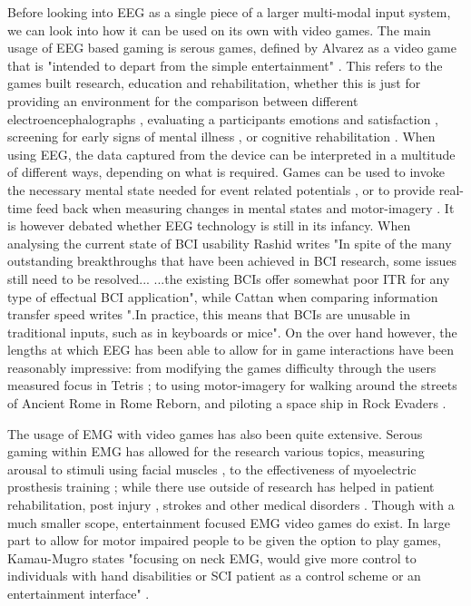 \documentclass[11pt, a4paper]{article}
\begin{document}
Before looking into EEG as a single piece of a larger multi-modal input system, we can look into how it can be used on its own with video games. The main usage of EEG based gaming is serous games, defined by Alvarez as a video game that is "intended to depart from the simple entertainment" \cite{alvarez2011introduction}. This refers to the games built research, education and rehabilitation, whether this is just for providing an environment for the comparison between different electroencephalographs \cite{liarokapis2014comparing}, evaluating a participants emotions and satisfaction \cite{vourvopoulos2013brain}, screening for early signs of mental illness \cite{tarnanas2015comparison}, or cognitive rehabilitation \cite{alchalcabi2017more}. When using EEG, the data captured from the device can be interpreted in a multitude of different ways, depending on what is required. Games can be used to invoke the necessary mental state needed for event related potentials \cite{ahn2011using}, or to provide real-time feed back when measuring changes in mental states \cite{liarokapis2015examining} and motor-imagery \cite{ndulue2019driving}. It is however debated whether EEG technology is still in its infancy. When analysing the current state of BCI usability Rashid \cite{rashid2020current} writes "In spite of the many outstanding breakthroughs that have been achieved in BCI research, some issues still need to be resolved...  ...the existing BCIs offer somewhat poor ITR for any type of effectual BCI application", while Cattan when comparing information transfer speed writes ".In practice, this means that BCIs are unusable in traditional inputs, such as in keyboards or mice". On the over hand however, the lengths at which EEG has been able to allow for in game interactions have been reasonably impressive: from modifying the games difficulty through the users measured focus in Tetris \cite{liarokapis2015examining}; to using motor-imagery for walking around the streets of Ancient Rome in Rome Reborn, \cite{ndulue2019driving} and piloting a space ship in Rock Evaders \cite{ndulue2019driving}.

\hfill

The usage of EMG with video games has also been quite extensive. Serous gaming within EMG has allowed for the research various topics, measuring arousal to stimuli using facial muscles \cite{schuurink2008engagement}, to the effectiveness of myoelectric prosthesis training \cite{bessa2020designing}; while there use outside of research has helped in patient rehabilitation, post injury \cite{gutierrez2020serious} \cite{schonauer2011full}, strokes \cite{ghassemi2019development} and other medical disorders \cite{labruyere2013requirements}. Though with a much smaller scope, entertainment focused EMG video games do exist. In large part to allow for motor impaired people to be given the option to play games, Kamau-Mugro states "focusing on neck EMG, would give more control to individuals with hand disabilities or SCI patient as a control scheme or an entertainment interface" \cite{muguro2020development}.
\end{document}
